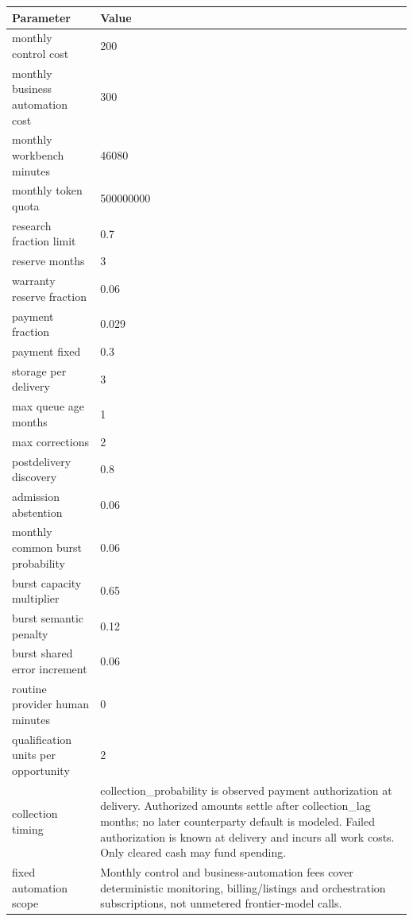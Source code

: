 \documentclass[10pt]{article}
\begin{document}
\begin{longtable}{p{.44\linewidth}p{.50\linewidth}}\toprule Parameter & Value \\\midrule\endhead

monthly control cost & 200\\

monthly business automation cost & 300\\

monthly workbench minutes & 46080\\

monthly token quota & 500000000\\

research fraction limit & 0.7\\

reserve months & 3\\

warranty reserve fraction & 0.06\\

payment fraction & 0.029\\

payment fixed & 0.3\\

storage per delivery & 3\\

max queue age months & 1\\

max corrections & 2\\

postdelivery discovery & 0.8\\

admission abstention & 0.06\\

monthly common burst probability & 0.06\\

burst capacity multiplier & 0.65\\

burst semantic penalty & 0.12\\

burst shared error increment & 0.06\\

routine provider human minutes & 0\\

qualification units per opportunity & 2\\

collection timing & collection\_\allowbreak{}probability is observed payment authorization at delivery. Authorized amounts settle after collection\_\allowbreak{}lag months; no later counterparty default is modeled. Failed authorization is known at delivery and incurs all work costs. Only cleared cash may fund spending.\\

fixed automation scope & Monthly control and business-automation fees cover deterministic monitoring, billing/listings and orchestration subscriptions, not unmetered frontier-model calls.\\

\bottomrule\end{longtable}
\end{document}
